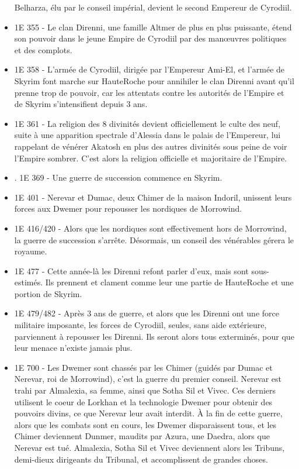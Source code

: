 \begin{itemize}
Belharza, élu par le conseil impérial, devient le second Empereur de Cyrodiil.
\item
1E 355 - Le clan Direnni, une famille Altmer de plus en plus puissante, étend son pouvoir dans le jeune Empire de Cyrodiil par des manœuvres politiques et des complots.
\item
1E 358 - L'armée de Cyrodiil, dirigée par l'Empereur Ami-El, et l'armée de Skyrim font marche sur HauteRoche pour annihiler le clan Direnni avant qu'il prenne trop de pouvoir, car les attentats contre les autorités de l'Empire et de Skyrim s'intensifient depuis 3 ans.
\item
1E 361 - La religion des 8 divinités devient officiellement le culte des neuf, suite à une apparition spectrale d'Alessia dans le palais de l'Empereur, lui rappelant de vénérer Akatosh en plus des autres divinités sous peine de voir l'Empire sombrer. C'est alors la religion officielle et majoritaire de l'Empire.
\item.
1E 369 - Une guerre de succession commence en Skyrim.
\item
1E 401 - Nerevar et Dumac, deux Chimer de la maison Indoril, unissent leurs forces aux Dwemer pour repousser les nordiques de Morrowind.
\item
1E 416/420 - Alors que les nordiques sont effectivement hors de Morrowind, la guerre de succession s'arrête. Désormais, un conseil des vénérables gérera le royaume.
\item
1E 477 - Cette année-là les Direnni refont parler d'eux, mais sont sous-estimés. Ils prennent et clament comme leur une partie de HauteRoche et une portion de Skyrim.
\item
1E 479/482 - Après 3 ans de guerre, et alors que les Direnni ont une force militaire imposante, les forces de Cyrodiil, seules, sans aide extérieure, parviennent à repousser les Direnni. Ils seront alors tous exterminés, pour que leur menace n'existe jamais plus.
\item
1E 700 - Les Dwemer sont chassés par les Chimer (guidés par Dumac et Nerevar, roi de Morrowind), c'est la guerre du premier conseil. Nerevar est trahi par Almalexia, sa femme, ainsi que Sotha Sil et Vivec. Ces derniers utilisent le coeur de Lorkhan et la technologie Dwemer pour obtenir des pouvoirs divins, ce que Nerevar leur avait interdit. À la fin de cette guerre, alors que les combats sont en cours, les Dwemer disparaissent tous, et les Chimer deviennent Dunmer, maudits par Azura, une Daedra, alors que Nerevar est tué. Almalexia, Sotha Sil et Vivec deviennent alors les Tribuns, demi-dieux dirigeants du Tribunal, et accomplissent de grandes choses.

\end{itemize}
